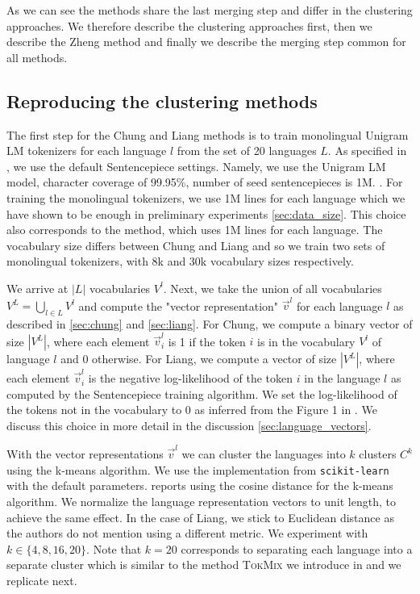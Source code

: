 As we can see the methods share the last merging step and differ in the clustering approaches. We therefore describe the clustering approaches first, then we describe the Zheng method and finally we describe the merging step common for all methods.

\subsection{Reproducing the clustering methods}

The first step for the Chung and Liang methods is to train monolingual Unigram LM tokenizers for each language $l$ from the set of 20 languages $L$. As specified in \citet{chung_improving_2020}, we use the default Sentencepiece settings. Namely, we use the Unigram LM model, character coverage of 99.95\%, number of seed sentencepieces is 1M. . 
For training the monolingual tokenizers, we use 1M lines for each language which we have shown to be enough in preliminary experiments \autoref{sec:data_size}. This choice also corresponds to the \citet{zheng_allocating_2021} method, which uses 1M lines for each language. The vocabulary size differs between Chung and Liang and so we train two sets of monolingual tokenizers, with 8k and 30k vocabulary sizes respectively.

We arrive at $|L|$ vocabularies $V^l$. Next, we take the union of all vocabularies $V^L = \bigcup_{l \in L} V^l$ and compute the "vector representation" $\vec{v}^l$ for each language $l$ as described in \autoref{sec:chung} and \autoref{sec:liang}. For Chung, we compute a binary vector of size $|V^L|$, where each element $\vec{v}^l_i$ is 1 if the token $i$ is in the vocabulary $V^l$ of language $l$ and 0 otherwise. For Liang, we compute a vector of size $|V^L|$, where each element $\vec{v}^l_i$ is the negative log-likelihood of the token $i$ in the language $l$ as computed by the Sentencepiece training algorithm. We set the log-likelihood of the tokens not in the vocabulary to 0 as inferred from the Figure 1 in \cite{liang_xlm-v_2023}. We discuss this choice in more detail in the discussion \autoref{sec:language_vectors}.

With the vector representations $\vec{v}^l$ we can cluster the languages into $k$ clusters $C^k$ using the k-means algorithm. We use the implementation from \texttt{scikit-learn} \cite{pedregosa_scikit-learn_2011} with the default parameters. \citet{chung_improving_2020} reports using the cosine distance for the k-means algorithm. We normalize the language representation vectors to unit length, to achieve the same effect. In the case of Liang, we stick to Euclidean distance as the authors do not mention using a different metric. We experiment with $k \in \{4, 8, 16, 20\}$. Note that $k=20$ corresponds to separating each language into a separate cluster which is similar to the method \textsc{TokMix} we introduce in \citet{limisiewicz_tokenization_2023} and \citet{zheng_allocating_2021} we replicate next.

